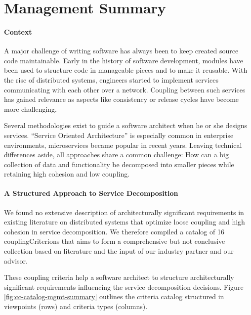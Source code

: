 \chapter{Management Summary}


\subsubsection{Context}

A major challenge of writing software has always been to keep created source code maintainable. Early in the history of software development, modules have been used to structure code in manageable pieces and to make it reusable. With the rise of distributed systems, engineers started to implement services communicating with each other over a network. Coupling between such services has gained relevance as aspects like consistency or release cycles have become more challenging.

Several methodologies exist to guide a software architect when he or she designs services. \enquote{Service Oriented Architecture} is especially common in enterprise environments, microservices became popular in recent years. Leaving technical differences aside, all approaches share a common challenge: How can a big collection of data and functionality be decomposed into smaller pieces while retaining high cohesion and low coupling.

\subsubsection{A Structured Approach to Service Decomposition}

We found no extensive description of architecturally significant requirements in existing literature on distributed systems that optimize loose coupling and high cohesion in service decomposition. We therefore compiled a catalog of 16 \glspl{couplingCriterion} that aims to form a comprehensive but not conclusive collection based on literature and the input of our industry partner and our advisor. 

These coupling criteria help a software architect to structure architecturally significant requirements influencing the service decomposition decisions. Figure \ref{fig:cc-catalog-mgmt-summary} outlines the criteria catalog structured in viewpoints (rows) and criteria types (columns).
 
